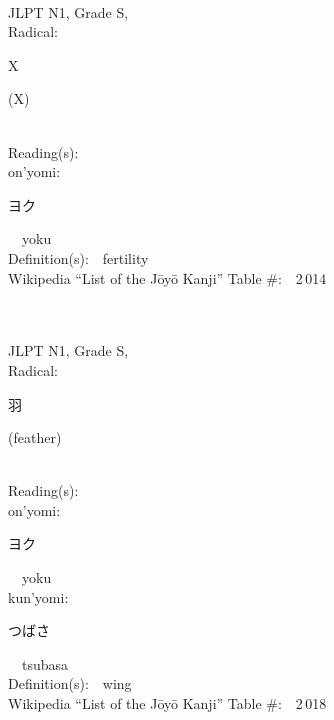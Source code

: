 \begin{multicols}{2}
{\fontsize{34pt}{40pt}  }\ \ \\
{JLPT N1, Grade S, \\Radical:\ \ {\begin{CJK}{UTF8}{min} X \end{CJK}} (X) } \\
Reading(s):\ \ \\
{\hspace*{1em}}on'yomi:\ \ \\
{\hspace*{2em}}{\begin{CJK}{UTF8}{min} ヨク \end{CJK}}\ \ yoku\ \ \\
Definition(s):\ \ fertility \\
Wikipedia ``List of the J\=oy\=o Kanji'' Table \#:\ \ 2\,014 \\
\ \ \\
{\fontsize{34pt}{40pt}  }\ \ \\
{JLPT N1, Grade S, \\Radical:\ \ {\begin{CJK}{UTF8}{min} 羽 \end{CJK}} (feather) } \\
Reading(s):\ \ \\
{\hspace*{1em}}on'yomi:\ \ \\
{\hspace*{2em}}{\begin{CJK}{UTF8}{min} ヨク \end{CJK}}\ \ yoku\ \ \\
{\hspace*{1em}}kun'yomi:\ \ \\
{\hspace*{2em}}{\begin{CJK}{UTF8}{min} つばさ \end{CJK}}\ \ tsubasa\ \ \\
Definition(s):\ \ wing \\
Wikipedia ``List of the J\=oy\=o Kanji'' Table \#:\ \ 2\,018 \\
\ \ \\
{\fontsize{34pt}{40pt}  }\ \ \\

\end{multicols}
